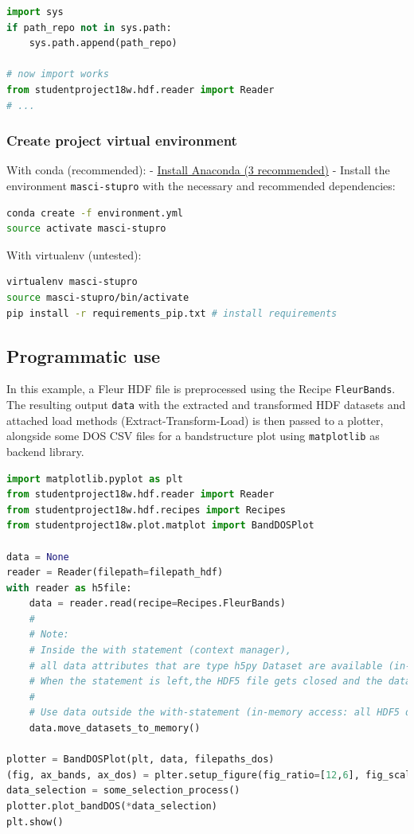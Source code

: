 \begin{lstlisting}[language=python, style=code]
import sys
if path_repo not in sys.path:
    sys.path.append(path_repo)
    
# now import works
from studentproject18w.hdf.reader import Reader
# ...
\end{lstlisting}

\subsubsection{Create project virtual
environment}\label{create-project-virtual-environment}

With conda (recommended): -
\href{https://www.anaconda.com/download}{Install Anaconda (3
recommended)} - Install the environment \texttt{masci-stupro} with the
necessary and recommended dependencies:


\begin{lstlisting}[language=bash, style=code]
conda create -f environment.yml
source activate masci-stupro
\end{lstlisting}

With virtualenv (untested):

\begin{lstlisting}[language=bash, style=code]
virtualenv masci-stupro
source masci-stupro/bin/activate
pip install -r requirements_pip.txt # install requirements
\end{lstlisting}

\subsection{Programmatic use}\label{programmatic-use}

In this example, a Fleur HDF file is preprocessed using the Recipe
\texttt{FleurBands}. The resulting output \texttt{data} with the extracted and
transformed HDF datasets and attached load methods (Extract-Transform-Load) is
then passed to a plotter, alongside some DOS CSV files for a bandstructure plot
using \texttt{matplotlib} as backend library.

\begin{lstlisting}[language=python, style=code]
import matplotlib.pyplot as plt
from studentproject18w.hdf.reader import Reader
from studentproject18w.hdf.recipes import Recipes
from studentproject18w.plot.matplot import BandDOSPlot

data = None
reader = Reader(filepath=filepath_hdf)
with reader as h5file:
    data = reader.read(recipe=Recipes.FleurBands)
    #
    # Note:
    # Inside the with statement (context manager),
    # all data attributes that are type h5py Dataset are available (in-file access)
    # When the statement is left,the HDF5 file gets closed and the datasets are closed.
    #
    # Use data outside the with-statement (in-memory access: all HDF5 datasets converted to numpy ndarrays):
    data.move_datasets_to_memory()

plotter = BandDOSPlot(plt, data, filepaths_dos)
(fig, ax_bands, ax_dos) = plter.setup_figure(fig_ratio=[12,6], fig_scale=1, fig_title="BandDOS")
data_selection = some_selection_process()
plotter.plot_bandDOS(*data_selection)
plt.show()
\end{lstlisting}


